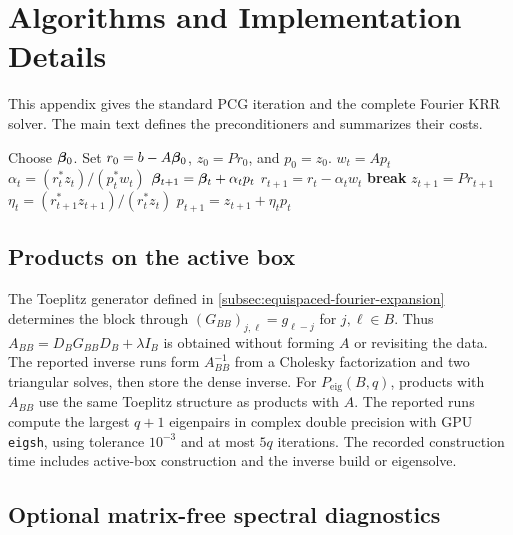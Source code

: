 \section{Algorithms and Implementation Details}
\label{app:algorithms-implementation}

This appendix gives the standard PCG iteration and the complete Fourier KRR
solver. The main text defines the preconditioners and summarizes their costs.

\begin{algorithm}[H]
\caption{Preconditioned conjugate gradient}
\label{alg:pcg}
\begin{algorithmic}[1]
\State Choose \(\boldsymbol\beta_0\). Set
\(r_0=b-A\boldsymbol\beta_0\), \(z_0=Pr_0\), and \(p_0=z_0\).
    \State \(w_t=Ap_t\)
    \State \(\alpha_t=(r_t^*z_t)/(p_t^*w_t)\)
    \State \(\boldsymbol\beta_{t+1}=\boldsymbol\beta_t+\alpha_t p_t\)
    \State \(r_{t+1}=r_t-\alpha_tw_t\)
        \State \textbf{break}
    \EndIf
    \State \(z_{t+1}=Pr_{t+1}\)
    \State \(\eta_t=(r_{t+1}^*z_{t+1})/(r_t^*z_t)\)
    \State \(p_{t+1}=z_{t+1}+\eta_t p_t\)
\EndFor
\end{algorithmic}
\end{algorithm}

\subsection{Products on the active box}
\label{subsec:active-box-local-operators}

The Toeplitz generator defined in \cref{subsec:equispaced-fourier-expansion}
determines the block through \((G_{BB})_{j,\ell}=g_{\ell-j}\) for
\(j,\ell\in B\).
Thus \(A_{BB}=D_BG_{BB}D_B+\lambda I_B\) is obtained without forming \(A\)
or revisiting the data. The reported inverse runs form \(A_{BB}^{-1}\) from a
Cholesky factorization and two triangular solves, then store the dense inverse.
For \(P_{\mathrm{eig}}(B,q)\), products with \(A_{BB}\) use the same Toeplitz
structure as products with \(A\). The reported runs compute the largest
\(q+1\) eigenpairs in complex double precision with GPU \texttt{eigsh}, using
tolerance \(10^{-3}\) and at most \(5q\) iterations. The recorded construction
time includes active-box construction and the inverse build or eigensolve.

\subsection{Optional matrix-free spectral diagnostics}
\label{subsec:matrix-free-spectral-diagnostics}

